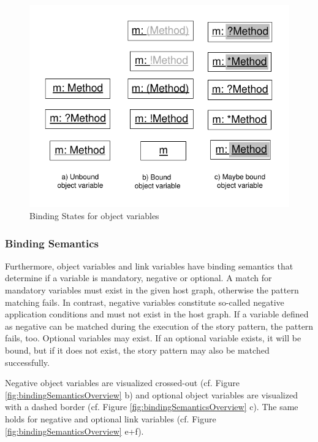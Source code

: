 \begin{figure}[htbp]
  \centering
  \includegraphics[scale=1.2]{figures/BindingStatesOverview}
  \caption{Binding States for object variables}
  \label{fig:bindingStatesOverview}
\end{figure}

\subsubsection{Binding Semantics}
\label{sec:StoryPatterns:binding:semantics}
Furthermore, object variables and link variables have binding semantics that
determine if a variable is mandatory, negative or optional.
A match for mandatory variables must exist in the given host graph, otherwise
the pattern matching fails. 
In contrast, negative variables constitute so-called negative application
conditions and must not exist in the host graph. If a variable defined as
negative can be matched during the execution of the story pattern, the pattern
fails, too. Optional variables may exist. If an optional variable exists, it will be
bound, but if it does not exist, the story pattern may also be matched
successfully.

Negative object variables are visualized crossed-out (cf. Figure
\ref{fig:bindingSemanticsOverview} b) and optional object variables are
visualized with a dashed border (cf. Figure \ref{fig:bindingSemanticsOverview} c).
The same holds for negative and optional link variables (cf. Figure
\ref{fig:bindingSemanticsOverview} e+f).

